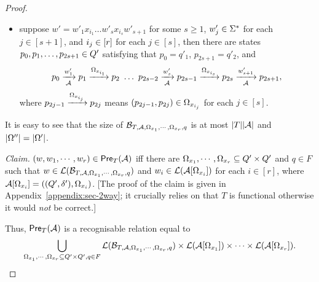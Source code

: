 \begin{proof}
\begin{itemize}
%
\item suppose $w' = w'_1 x_{i_1} \ldots w'_{s} x_{i_{s}} w'_{s+1}$ for some $s \ge 1$, $w'_j \in \Sigma^*$ for each $j \in [s+1]$,  and $i_j \in [r]$ for each $j \in [s]$, then there are states $p_0, p_1, \ldots, p_{2s+1} \in Q'$ satisfying that $p_0 = q'_1$, $p_{2s+1} = q'_2$, and 
$$p_0 \xrightarrow[\mathcal{A}]{w'_1} p_1 \xrightarrow{\Omega_{x_{i_1}}} p_2\ \ldots\ p_{2s-2} \xrightarrow[\mathcal{A}]{w'_s}p_{2s-1} \xrightarrow{\Omega_{x_{i_s}}} p_{2s} \xrightarrow[\mathcal{A}]{w'_{s+1}} p_{2s+1},$$ 
where $p_{2j-1} \xrightarrow{\Omega_{x_{i_j}}} p_{2j}$ means $(p_{2j-1}, p_{2j}) \in \Omega_{x_{i_j}}$ for each $j \in [s]$.
\end{itemize}
%
%
It is easy to see that  the size of $\mathcal{B}_{T, \mathcal{A}, \Omega_{x_1}, \cdots, \Omega_{x_r}, q}$ is at most $|T||\mathcal{A}|$ and $|\Omega''| = |\Omega'|$.   

\smallskip
\noindent
\emph{Claim.} %
$(w, w_1,\cdots, w_r) \in \textsf{Pre}_{T}(\mathcal{A})$ iff there are $\Omega_{x_1}, \cdots, \Omega_{x_r} \subseteq Q' \times Q'$ and $q \in F$ such that $w \in \mathcal{L}(\mathcal{B}_{T, \mathcal{A}, \Omega_{x_1}, \cdots, \Omega_{x_r}, q})$ and $w_i \in \mathcal{L}(\mathcal{A}[\Omega_{x_i}])$ for each $i \in [r]$, where $\mathcal{A}[\Omega_{x_i}]=((Q', \delta'), \Omega_{x_i})$. [The proof of the claim is given in Appendix~\ref{appendix:sec-2way}; it crucially relies on that $T$ is functional otherwise it would \emph{not} be correct.]
\smallskip

Thus, $\textsf{Pre}_{T}(\mathcal{A})$ is a recognisable relation equal to
\[
\bigcup_{\Omega_{x_1}, \cdots, \Omega_{x_r} \subseteq Q' \times Q', q\in F} \mathcal{L}(\mathcal{B}_{T, \mathcal{A}, \Omega_{x_1}, \cdots, \Omega_{x_r},q}) \times \mathcal{L}(\mathcal{A}[\Omega_{x_1}]) \times \cdots  \times \mathcal{L}(\mathcal{A}[\Omega_{x_r}]).\]
%


\end{proof}
